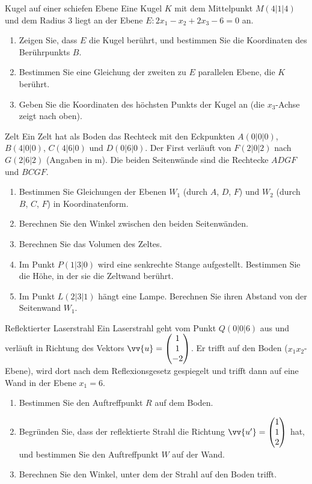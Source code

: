 \begin{uebung}{Kugel auf einer schiefen Ebene}
Eine Kugel $K$ mit dem Mittelpunkt $M(4|1|4)$ und dem Radius $3$ liegt an der Ebene $E: 2x_1-x_2+2x_3-6=0$ an.
\begin{enumerate}[label=\alph*)]
  \item Zeigen Sie, dass $E$ die Kugel berührt, und bestimmen Sie die Koordinaten des Berührpunkts $B$.
  \item Bestimmen Sie eine Gleichung der zweiten zu $E$ parallelen Ebene, die $K$ berührt.
  \item Geben Sie die Koordinaten des höchsten Punkts der Kugel an (die $x_3$-Achse zeigt nach oben).
\end{enumerate}
\end{uebung}

\begin{uebung}{Zelt}
Ein Zelt hat als Boden das Rechteck mit den Eckpunkten $A(0|0|0)$, $B(4|0|0)$, $C(4|6|0)$ und $D(0|6|0)$. Der First verläuft von $F(2|0|2)$ nach $G(2|6|2)$ (Angaben in m). Die beiden Seitenwände sind die Rechtecke $ADGF$ und $BCGF$.
\begin{enumerate}[label=\alph*)]
  \item Bestimmen Sie Gleichungen der Ebenen $W_1$ (durch $A$, $D$, $F$) und $W_2$ (durch $B$, $C$, $F$) in Koordinatenform.
  \item Berechnen Sie den Winkel zwischen den beiden Seitenwänden.
  \item Berechnen Sie das Volumen des Zeltes.
  \item Im Punkt $P(1|3|0)$ wird eine senkrechte Stange aufgestellt. Bestimmen Sie die Höhe, in der sie die Zeltwand berührt.
  \item Im Punkt $L(2|3|1)$ hängt eine Lampe. Berechnen Sie ihren Abstand von der Seitenwand $W_1$.
\end{enumerate}
\end{uebung}

\begin{uebung}{Reflektierter Laserstrahl}
Ein Laserstrahl geht vom Punkt $Q(0|0|6)$ aus und verläuft in Richtung des Vektors $\vv{u} = \begin{pmatrix} 1\\ 1\\ -2\end{pmatrix}$. Er trifft auf den Boden ($x_1x_2$-Ebene), wird dort nach dem Reflexionsgesetz gespiegelt und trifft dann auf eine Wand in der Ebene $x_1 = 6$.
\begin{enumerate}[label=\alph*)]
  \item Bestimmen Sie den Auftreffpunkt $R$ auf dem Boden.
  \item Begründen Sie, dass der reflektierte Strahl die Richtung $\vv{u'} = \begin{pmatrix} 1\\ 1\\ 2\end{pmatrix}$ hat, und bestimmen Sie den Auftreffpunkt $W$ auf der Wand.
  \item Berechnen Sie den Winkel, unter dem der Strahl auf den Boden trifft.
\end{enumerate}
\end{uebung}

\UebungskapitelEnde
